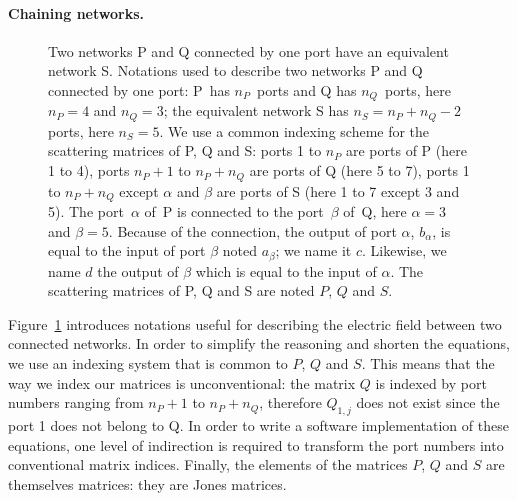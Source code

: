 \documentclass[a4paper,11pt]{article}
\begin{document}
\paragraph{Chaining networks.}
\begin{figure}[hbtp]
    \centering
    
    \caption{\label{fig:between_networks}
        Two networks P and Q connected by one port have an equivalent network S.
        Notations used to describe two networks P and Q connected by one port:
        P~has $n_P$~ports and Q has $n_Q$~ports, here $n_P=4$ and $n_Q=3$;
        the equivalent network S has $n_S = n_P + n_Q - 2$ ports, here $n_S=5$.
        We use a common indexing scheme for the scattering matrices of P, Q and S:
        ports 1 to $n_P$ are ports of P (here 1 to 4),
        ports $n_P+1$ to $n_P+n_Q$ are ports of Q (here 5 to 7),
        ports 1 to $n_P+n_Q$ except $\alpha$ and $\beta$ are ports of S (here 1 to 7 except 3 and 5).
        The port~$\alpha$ of~P is connected to the port~$\beta$ of~Q, here $\alpha=3$ and $\beta=5$.
        Because of the connection, the output of port $\alpha$, $b_\alpha$, is equal to the input of port $\beta$ noted $a_\beta$; we name it $c$.  Likewise, we name $d$ the output of $\beta$ which is equal to the input of $\alpha$.
        The scattering matrices of P, Q and S are noted $P$, $Q$ and $S$.
        }
\end{figure}
Figure~\ref{fig:between_networks} introduces notations useful for describing the electric field between two connected networks.
In order to simplify the reasoning and shorten the equations, we use an indexing system that is common to $P$, $Q$ and $S$.  This means that the way we index our matrices is unconventional: the matrix $Q$ is indexed by port numbers ranging from $n_P+1$ to $n_P + n_Q$, therefore $Q_{1, j}$ does not exist since the port 1 does not belong to Q.  In order to write a software implementation of these equations, one level of indirection is required to transform the port numbers into conventional matrix indices.
Finally, the elements of the matrices $P$, $Q$ and $S$ are themselves matrices: they are Jones matrices.
\end{document}
